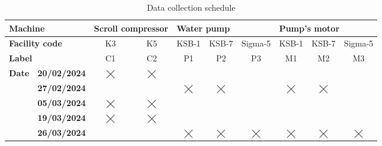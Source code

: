 \begin{table}[h]
\renewcommand{\arraystretch}{1.2}
\begin{adjustbox}{width=\columnwidth,center}
\begin{tabular}{|ll|cc|ccc|ccc|}
\hline
\multicolumn{2}{|l|}{\textbf{Machine}}                                     & \multicolumn{2}{l|}{\textbf{Scroll compressor}} & \multicolumn{3}{l|}{\textbf{Water pump}}                                          & \multicolumn{3}{l|}{\textbf{Pump's motor}}                                        \\ \hline
\multicolumn{2}{|l|}{\textbf{Facility code}}                            & \multicolumn{1}{c|}{K3}           & K5          & \multicolumn{1}{c|}{KSB-1}       & \multicolumn{1}{c|}{KSB-7}       & Sigma-5     & \multicolumn{1}{c|}{KSB-1}       & \multicolumn{1}{c|}{KSB-7}       & Sigma-5     \\ \hline
\multicolumn{2}{|l|}{\textbf{Label}}                                       & \multicolumn{1}{c|}{C1}           & C2          & \multicolumn{1}{c|}{P1}          & \multicolumn{1}{c|}{P2}          & P3          & \multicolumn{1}{c|}{M1}          & \multicolumn{1}{c|}{M2}          & M3          \\ \hline
\multicolumn{1}{|l|}{\multirow{5}{*}{\textbf{Date}}} & \textbf{20/02/2024} & \multicolumn{1}{c|}{$\bigtimes$}  & $\bigtimes$ & \multicolumn{1}{c|}{}            & \multicolumn{1}{c|}{}            &             & \multicolumn{1}{c|}{}            & \multicolumn{1}{c|}{}            &             \\ \cline{2-10} 
\multicolumn{1}{|l|}{}                               & \textbf{27/02/2024} & \multicolumn{1}{c|}{}             &             & \multicolumn{1}{c|}{$\bigtimes$} & \multicolumn{1}{c|}{$\bigtimes$} &             & \multicolumn{1}{c|}{$\bigtimes$} & \multicolumn{1}{c|}{$\bigtimes$} &             \\ \cline{2-10} 
\multicolumn{1}{|l|}{}                               & \textbf{05/03/2024} & \multicolumn{1}{c|}{$\bigtimes$}  & $\bigtimes$ & \multicolumn{1}{c|}{}            & \multicolumn{1}{c|}{}            &             & \multicolumn{1}{c|}{}            & \multicolumn{1}{c|}{}            &             \\ \cline{2-10} 
\multicolumn{1}{|l|}{}                               & \textbf{19/03/2024} & \multicolumn{1}{c|}{$\bigtimes$}  & $\bigtimes$ & \multicolumn{1}{c|}{}            & \multicolumn{1}{c|}{}            &             & \multicolumn{1}{c|}{}            & \multicolumn{1}{c|}{}            &             \\ \cline{2-10} 
\multicolumn{1}{|l|}{}                               & \textbf{26/03/2024} & \multicolumn{1}{c|}{}             &             & \multicolumn{1}{c|}{$\bigtimes$} & \multicolumn{1}{c|}{$\bigtimes$} & $\bigtimes$ & \multicolumn{1}{c|}{$\bigtimes$} & \multicolumn{1}{c|}{$\bigtimes$} & $\bigtimes$ \\ \hline
\end{tabular}
\end{adjustbox}
\caption{Data collection schedule}
\label{fig:design:data-schedule}
\end{table}

